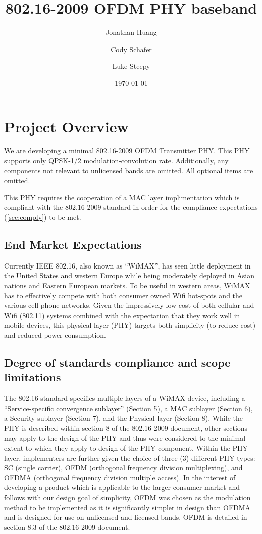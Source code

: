\documentclass[10pt,twocolumn]{article}
\title{802.16-2009 OFDM PHY baseband}
\author{Jonathan Huang \and Cody Schafer \and Luke Steepy}
\date{\today}
\begin{document}
\maketitle
\section{Project Overview}
We are developing a minimal 802.16-2009 OFDM Transmitter PHY.  This PHY
supports only QPSK-1/2 modulation-convolution rate. Additionally, any
components not relevant to unlicensed bands are omitted.  All optional items
are omitted.

This PHY requires the cooperation of a MAC layer implimentation which is
compliant with the 802.16-2009 standard in order for the compliance
expectations (\autoref{sec:comply}) to be met.

	\subsection{End Market Expectations}
	Currently IEEE 802.16, also known as ``WiMAX'', has seen little
	deployment in the United States and western Europe while being
	moderately deployed in Asian nations and Eastern European markets.
	To be useful in western areas, WiMAX has to effectively compete
	with both consumer owned Wifi hot-spots and the various cell phone
	networks. Given the impressively low cost of both cellular and Wifi
	(802.11) systems combined with the expectation that they work well
	in mobile devices, this physical layer (PHY) targets both
	simplicity (to reduce cost) and reduced power consumption.

	\subsection{Degree of standards compliance and scope limitations}
	\label{sec:comply}
	The 802.16 standard specifies multiple layers of a WiMAX device,
	including a ``Service-specific convergence sublayer'' (Section 5),
	a MAC sublayer (Section 6), a Security sublayer (Section 7), and
	the Physical layer (Section 8). While the PHY is described within
	section 8 of the 802.16-2009 document, other sections may apply to
	the design of the PHY and thus were considered to the minimal
	extent to which they apply to design of the PHY component.  Within
	the PHY layer, implementers are further given the choice of three
	(3) different PHY types: SC (single carrier), OFDM (orthogonal
	frequency division multiplexing), and OFDMA (orthogonal frequency
	division multiple access). In the interest of developing a product
	which is applicable to the larger consumer market and follows with
	our design goal of simplicity, OFDM was chosen as the modulation
	method to be implemented as it is significantly simpler in design
	than OFDMA and is designed for use on unlicensed and licensed
	bands. OFDM is detailed in section 8.3 of the 802.16-2009 document.
\end{document}
